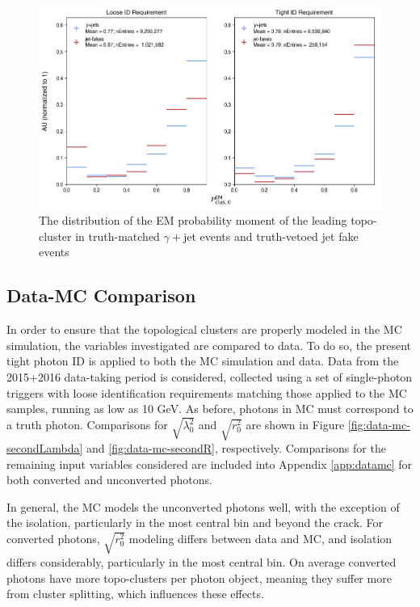 \begin{figure}[htb]
    \centering 
    \includegraphics[width=\textwidth]{chapters/chapter4_photonID/images/hists/y_topoCluster0_emProbability.png}
    \caption[The distribution of the \gls{EM} probability moment of the leading topo-cluster]{The distribution of the \gls{EM} probability moment of the leading topo-cluster in truth-matched $\gamma+$jet events and truth-vetoed jet fake events}
    \label{fig:topo-emProb}
\end{figure}


\subsection{Data-MC Comparison} \label{ssec:yid-datamc}
In order to ensure that the topological clusters are properly modeled in the \gls{MC} simulation, the variables investigated are compared to data. To do so, the present tight photon ID is applied to both the \gls{MC} simulation and data. Data from the 2015+2016 data-taking period is considered, collected using a set of single-photon triggers with loose identification requirements matching those applied to the \gls{MC} samples, running as low as 10 GeV. As before, photons in \gls{MC} must correspond to a truth photon. Comparisons for $\sqrt{\lambda_{0}^2}$ and $\sqrt{r_{0}^2}$ are shown in Figure \ref{fig:data-mc-secondLambda} and \ref{fig:data-mc-secondR}, respectively. Comparisons for the remaining input variables considered are included into Appendix \ref{app:datamc} for both converted and unconverted photons.

In general, the \gls{MC} models the unconverted photons well, with the exception of the isolation, particularly in the most central bin and beyond the crack. For converted photons, $\sqrt{r_{0}^2}$ modeling differs between data and \gls{MC}, and isolation differs considerably, particularly in the most central bin. On average converted photons have more topo-clusters per photon object, meaning they suffer more from cluster splitting, which influences these effects.


